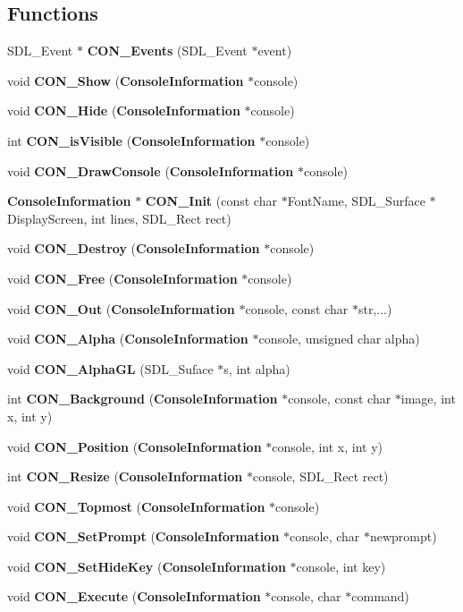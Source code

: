 \subsection*{Functions}
\begin{CompactItemize}
\item 
SDL\_\-Event $\ast$ {\bf CON\_\-Events} (SDL\_\-Event $\ast$event)
\item 
void {\bf CON\_\-Show} ({\bf Console\-Information} $\ast$console)
\item 
void {\bf CON\_\-Hide} ({\bf Console\-Information} $\ast$console)
\item 
int {\bf CON\_\-is\-Visible} ({\bf Console\-Information} $\ast$console)
\item 
void {\bf CON\_\-Draw\-Console} ({\bf Console\-Information} $\ast$console)
\item 
{\bf Console\-Information} $\ast$ {\bf CON\_\-Init} (const char $\ast$Font\-Name, SDL\_\-Surface $\ast$Display\-Screen, int lines, SDL\_\-Rect rect)
\item 
void {\bf CON\_\-Destroy} ({\bf Console\-Information} $\ast$console)
\item 
void {\bf CON\_\-Free} ({\bf Console\-Information} $\ast$console)
\item 
void {\bf CON\_\-Out} ({\bf Console\-Information} $\ast$console, const char $\ast$str,...)
\item 
void {\bf CON\_\-Alpha} ({\bf Console\-Information} $\ast$console, unsigned char alpha)
\item 
void {\bf CON\_\-Alpha\-GL} (SDL\_\-Suface $\ast$s, int alpha)
\item 
int {\bf CON\_\-Background} ({\bf Console\-Information} $\ast$console, const char $\ast$image, int x, int y)
\item 
void {\bf CON\_\-Position} ({\bf Console\-Information} $\ast$console, int x, int y)
\item 
int {\bf CON\_\-Resize} ({\bf Console\-Information} $\ast$console, SDL\_\-Rect rect)
\item 
void {\bf CON\_\-Topmost} ({\bf Console\-Information} $\ast$console)
\item 
void {\bf CON\_\-Set\-Prompt} ({\bf Console\-Information} $\ast$console, char $\ast$newprompt)
\item 
void {\bf CON\_\-Set\-Hide\-Key} ({\bf Console\-Information} $\ast$console, int key)
\item 
void {\bf CON\_\-Execute} ({\bf Console\-Information} $\ast$console, char $\ast$command)
\item 

\end{CompactItemize}
